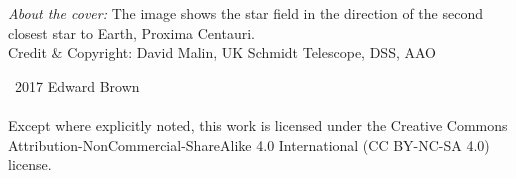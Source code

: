 
\maketitle
\newpage
\begin{fullwidth}
\thispagestyle{empty}

\vspace{3\baselineskip}
\noindent \textit{About the cover:} The image shows the star field in the direction of the second closest star to Earth, Proxima Centauri.\\
\noindent Credit \& Copyright: David Malin, UK Schmidt Telescope, DSS, AAO

\vfill
\noindent \ccCopy\ 2017 Edward Brown\\

\vspace{3\baselineskip}
\noindent \ccbyncsa \\
\noindent Except where explicitly noted, this work is licensed under the Creative Commons
Attribution-NonCommercial-ShareAlike 4.0 International (CC BY-NC-SA
4.0) license.

\end{fullwidth}

\newpage


\tableofcontents
\listoffigures
\listoftables
\listofexercises
